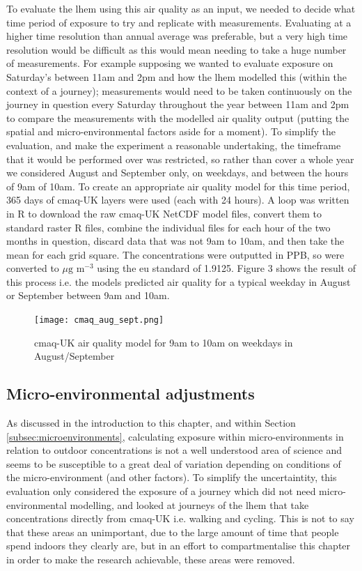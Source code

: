 To evaluate the \gls{lhem} using this air quality as an input, we needed to decide what time period of exposure to try and replicate with measurements. Evaluating at a higher time resolution than annual average was preferable, but a very high time resolution would be difficult as this would mean needing to take a huge number of measurements. For example supposing we wanted to evaluate exposure on Saturday’s between 11am and 2pm and how the \gls{lhem} modelled this (within the context of a journey); measurements would need to be taken continuously on the journey in question every Saturday throughout the year between 11am and 2pm to compare the measurements with the modelled air quality output (putting the spatial and micro-environmental factors aside for a moment). 
To simplify the evaluation, and make the experiment a reasonable undertaking, the timeframe that it would be performed over was restricted, so rather than cover a whole year we considered August and September only, on weekdays, and between the hours of 9am of 10am. To create an appropriate air quality model for this time period, 365 days of \gls{cmaq}-UK layers were used (each with 24 hours). A loop was written in R to download the raw \gls{cmaq}-UK NetCDF model files, convert them to standard raster R files, combine the individual files for each hour of the two months in question, discard data that was not 9am to 10am, and then take the mean for each grid square. The concentrations were outputted in PPB, so were converted to $\mu \text{g m}^{-3}$ using the \gls{eu} standard of 1.9125. Figure 3 shows the result of this process i.e. the models predicted air quality for a typical weekday in August or September between 9am and 10am.

\begin{figure}[H]
\centering
\texttt{[image: cmaq\_aug\_sept.png]}
\caption{\gls{cmaq}-UK air quality model for 9am to 10am on weekdays in August/September}
\label{fig:cmaq_aug_sept}
\end{figure}

\subsection{Micro-environmental adjustments}
\label{subsec:4microenvironmentaladjustments}

As discussed in the introduction to this chapter, and within Section \ref{subsec:microenvironments}, calculating exposure within micro-environments in relation to outdoor concentrations is not a well understood area of science and seems to be susceptible to a great deal of variation depending on conditions of the micro-environment (and other factors). To simplify the uncertaintity, this evaluation only considered the exposure of a journey which did not need micro-environmental modelling, and looked at journeys of the \gls{lhem} that take concentrations directly from \gls{cmaq}-UK i.e. walking and cycling. This is not to say that these areas an unimportant, due to the large amount of time that people spend indoors they clearly are, but in an effort to compartmentalise this chapter in order to make the research achievable, these areas were removed.

